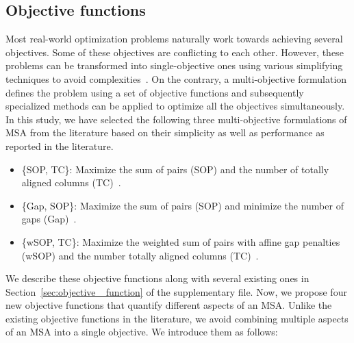 \subsection{Objective functions}
\label{sec:formulation}
Most real-world optimization problems naturally work towards achieving several objectives. Some of these objectives are conflicting to each other. However, these problems can be transformed into single-objective ones using various simplifying techniques to avoid complexities~\citep{kalyanmoy2001multi}. On the contrary, a multi-objective formulation defines the problem using a set of objective functions and subsequently specialized methods can be applied to optimize all the objectives simultaneously. In this study, we have selected the following three multi-objective formulations of MSA from the literature based on their simplicity as well as performance as reported in the literature.
\begin{itemize}
	\item \{SOP, TC\}: Maximize the sum of pairs (SOP) and the number of totally aligned columns (TC)~\citep{da2010alineaga}.
	
	\item \{Gap, SOP\}: Maximize the sum of pairs (SOP) and minimize the number of gaps (Gap)~\citep{abbasi2015local}.
	
	\item \{wSOP, TC\}: Maximize the weighted sum of pairs with affine gap penalties (wSOP) and the number totally aligned columns (TC)~\citep{rubio2016hybrid}.
\end{itemize}

We describe these objective functions along with several existing ones in Section~\ref{sec:objective _function} of the supplementary file. Now, we propose four new objective functions that quantify different aspects of an MSA. Unlike the existing objective functions in the literature, we avoid combining multiple aspects of an MSA into a single objective. We introduce them as follows: 

